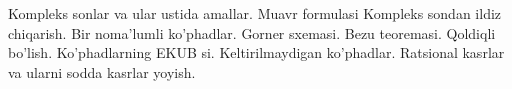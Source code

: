 Kompleks sonlar va ular ustida amallar. Muavr formulasi 
Kompleks sondan ildiz chiqarish.
Bir noma’lumli ko’phadlar. Gorner sxemasi. Bezu teoremasi. 
Qoldiqli bo’lish. 
Ko’phadlarning EKUB si. Keltirilmaydigan ko’phadlar.
Ratsional kasrlar va ularni sodda kasrlar yoyish.